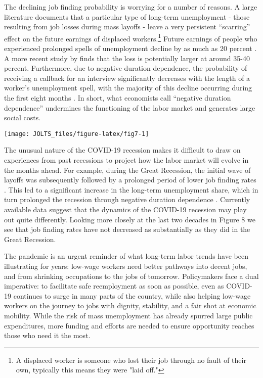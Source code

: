 \documentclass[
  11pt,
]{article}
\numberwithin{equation}{section}
\begin{document}
The declining job finding probability is worrying for a number of
reasons. A large literature documents that a particular type of
long-term unemployment - those resulting from job losses during mass
layoffs - leave a very persistent ``scarring'' effect on the future
earnings of displaced
workers.\footnote{A displaced worker is someone who lost their job through no fault of their own, typically this means they were "laid off."}
Future earnings of people who experienced prolonged spells of
unemployment decline by as much as 20 percent \cite{davis10}. A more
recent study by \cite{Guvenen17} finds that the loss is potentially
larger at around 35-40 percent. Furthermore, due to negative duration
dependence, the probability of receiving a callback for an interview
significantly decreases with the length of a worker's unemployment
spell, with the majority of this decline occurring during the first
eight months \cite{kroft13}. In short, what economists call ``negative
duration dependence'' undermines the functioning of the labor market and
generates large social costs.

\begin{center}\texttt{[image: JOLTS\_files/figure-latex/fig7-1]} \end{center}

The unusual nature of the COVID-19 recession makes it difficult to draw
on experiences from past recessions to project how the labor market will
evolve in the months ahead. For example, during the Great Recession, the
initial wave of layoffs was subsequently followed by a prolonged period
of lower job finding rates \citep{elsby09}. This led to a significant
increase in the long-term unemployment share, which in turn prolonged
the recession through negative duration dependence \citep{krueger14}.
Currently available data suggest that the dynamics of the COVID-19
recession may play out quite differently. Looking more closely at the
last two decades in Figure 8 we see that job finding rates have not
decreased as substantially as they did in the Great Recession.

The pandemic is an urgent reminder of what long-term labor trends have
been illustrating for years: low-wage workers need better pathways into
decent jobs, and from shrinking occupations to the jobs of tomorrow.
Policymakers face a dual imperative: to facilitate safe reemployment as
soon as possible, even as COVID-19 continues to surge in many parts of
the country, while also helping low-wage workers on the journey to jobs
with dignity, stability, and a fair shot at economic mobility. While the
risk of mass unemployment has already spurred large public expenditures,
more funding and efforts are needed to ensure opportunity reaches those
who need it the most.
\end{document}
